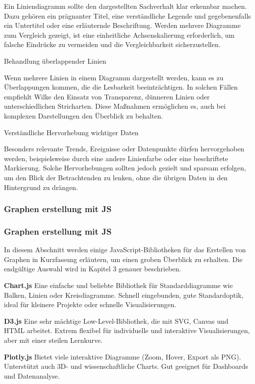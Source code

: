 Ein Liniendiagramm sollte den dargestellten Sachverhalt klar erkennbar machen.
Dazu gehören ein prägnanter Titel, eine verständliche Legende und gegebenenfalls ein Untertitel oder eine erläuternde Beschriftung.
Werden mehrere Diagramme zum Vergleich gezeigt, ist eine einheitliche Achsenskalierung erforderlich, um falsche Eindrücke zu vermeiden und die Vergleichbarkeit sicherzustellen.
\item
Behandlung überlappender Linien

Wenn mehrere Linien in einem Diagramm dargestellt werden, kann es zu Überlappungen kommen, die die Lesbarkeit beeinträchtigen.
In solchen Fällen empfiehlt Wilke den Einsatz von Transparenz, dünneren Linien oder unterschiedlichen Stricharten.
Diese Maßnahmen ermöglichen es, auch bei komplexen Darstellungen den Überblick zu behalten.
\item
Verständliche Hervorhebung wichtiger Daten

Besonders relevante Trends, Ereignisse oder Datenpunkte dürfen hervorgehoben werden, beispielsweise durch eine andere Linienfarbe oder eine beschriftete Markierung.
Solche Hervorhebungen sollten jedoch gezielt und sparsam erfolgen, um den Blick der Betrachtenden zu lenken, ohne die übrigen Daten in den Hintergrund zu drängen.

\subsubsection{Graphen erstellung mit JS}

\subsubsection{Graphen erstellung mit JS}
In diesem Abschnitt werden einige JavaScript-Bibliotheken für das Erstellen von Graphen
in Kurzfassung erläutern, um einen groben Überblick zu erhalten.
Die endgültige Auswahl wird in Kapitel 3 genauer beschrieben.

\textbf{Chart.js}
Eine einfache und beliebte Bibliothek für Standarddiagramme wie Balken, Linien
oder Kreisdiagramme. Schnell eingebunden, gute Standardoptik, ideal für
kleinere Projekte oder schnelle Visualisierungen.

\textbf{D3.js}
Eine sehr mächtige Low-Level-Bibliothek, die mit SVG, Canvas und HTML arbeitet.
Extrem flexibel für individuelle und interaktive Visualisierungen, aber mit
einer steilen Lernkurve.

\textbf{Plotly.js}
Bietet viele interaktive Diagramme (Zoom, Hover, Export als PNG). Unterstützt
auch 3D- und wissenschaftliche Charts. Gut geeignet für Dashboards und
Datenanalyse.

